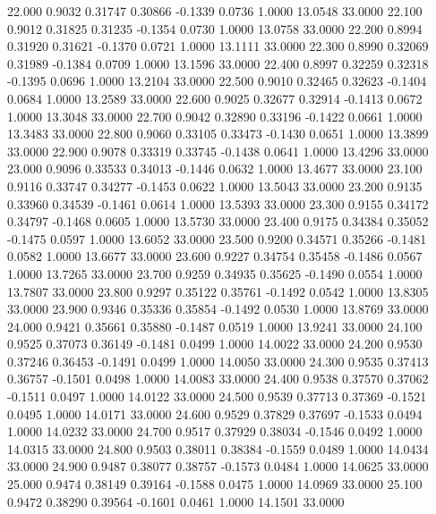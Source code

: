   22.000   0.9032   0.31747   0.30866  -0.1339   0.0736   1.0000  13.0548  33.0000
  22.100   0.9012   0.31825   0.31235  -0.1354   0.0730   1.0000  13.0758  33.0000
  22.200   0.8994   0.31920   0.31621  -0.1370   0.0721   1.0000  13.1111  33.0000
  22.300   0.8990   0.32069   0.31989  -0.1384   0.0709   1.0000  13.1596  33.0000
  22.400   0.8997   0.32259   0.32318  -0.1395   0.0696   1.0000  13.2104  33.0000
  22.500   0.9010   0.32465   0.32623  -0.1404   0.0684   1.0000  13.2589  33.0000
  22.600   0.9025   0.32677   0.32914  -0.1413   0.0672   1.0000  13.3048  33.0000
  22.700   0.9042   0.32890   0.33196  -0.1422   0.0661   1.0000  13.3483  33.0000
  22.800   0.9060   0.33105   0.33473  -0.1430   0.0651   1.0000  13.3899  33.0000
  22.900   0.9078   0.33319   0.33745  -0.1438   0.0641   1.0000  13.4296  33.0000
  23.000   0.9096   0.33533   0.34013  -0.1446   0.0632   1.0000  13.4677  33.0000
  23.100   0.9116   0.33747   0.34277  -0.1453   0.0622   1.0000  13.5043  33.0000
  23.200   0.9135   0.33960   0.34539  -0.1461   0.0614   1.0000  13.5393  33.0000
  23.300   0.9155   0.34172   0.34797  -0.1468   0.0605   1.0000  13.5730  33.0000
  23.400   0.9175   0.34384   0.35052  -0.1475   0.0597   1.0000  13.6052  33.0000
  23.500   0.9200   0.34571   0.35266  -0.1481   0.0582   1.0000  13.6677  33.0000
  23.600   0.9227   0.34754   0.35458  -0.1486   0.0567   1.0000  13.7265  33.0000
  23.700   0.9259   0.34935   0.35625  -0.1490   0.0554   1.0000  13.7807  33.0000
  23.800   0.9297   0.35122   0.35761  -0.1492   0.0542   1.0000  13.8305  33.0000
  23.900   0.9346   0.35336   0.35854  -0.1492   0.0530   1.0000  13.8769  33.0000
  24.000   0.9421   0.35661   0.35880  -0.1487   0.0519   1.0000  13.9241  33.0000
  24.100   0.9525   0.37073   0.36149  -0.1481   0.0499   1.0000  14.0022  33.0000
  24.200   0.9530   0.37246   0.36453  -0.1491   0.0499   1.0000  14.0050  33.0000
  24.300   0.9535   0.37413   0.36757  -0.1501   0.0498   1.0000  14.0083  33.0000
  24.400   0.9538   0.37570   0.37062  -0.1511   0.0497   1.0000  14.0122  33.0000
  24.500   0.9539   0.37713   0.37369  -0.1521   0.0495   1.0000  14.0171  33.0000
  24.600   0.9529   0.37829   0.37697  -0.1533   0.0494   1.0000  14.0232  33.0000
  24.700   0.9517   0.37929   0.38034  -0.1546   0.0492   1.0000  14.0315  33.0000
  24.800   0.9503   0.38011   0.38384  -0.1559   0.0489   1.0000  14.0434  33.0000
  24.900   0.9487   0.38077   0.38757  -0.1573   0.0484   1.0000  14.0625  33.0000
  25.000   0.9474   0.38149   0.39164  -0.1588   0.0475   1.0000  14.0969  33.0000
  25.100   0.9472   0.38290   0.39564  -0.1601   0.0461   1.0000  14.1501  33.0000
